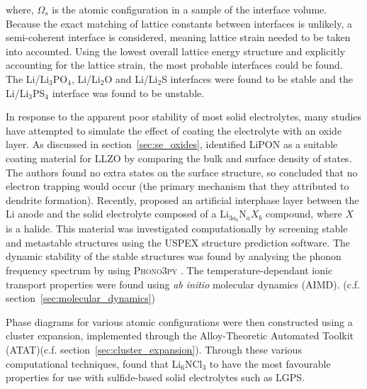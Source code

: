 \documentclass[../main.tex]{subfiles}
\begin{document}
where, $\Omega_s$ is the atomic configuration in a sample of the interface volume. Because the exact matching of lattice constants between interfaces is unlikely, a semi-coherent interface is considered, meaning lattice strain needed to be taken into accounted. Using the lowest overall lattice energy structure and explicitly accounting for the lattice strain, the most probable interfaces could be found. The Li/Li$_3$PO$_4$, Li/Li$_2$O and Li/Li$_2$S interfaces were found to be stable and the Li/Li$_3$PS$_4$ interface was found to be unstable.\cite{Lepley2015}

In response to the apparent poor stability of most solid electrolytes, many studies have attempted to simulate the effect of coating the electrolyte with an oxide layer\cite{Zhang2020directvis, Xiao2019coat, Tian2018}. As discussed in section~\ref{sec:se_oxides}, \citeauthor{Tian2018} identified LiPON as a suitable coating material for LLZO by comparing the bulk and surface density of states\cite{Tian2018}. The authors found no extra states on the surface structure, so concluded that no electron trapping would occur (the primary mechanism that they attributed to dendrite formation). Recently, \citeauthor{Sang2020} proposed an artificial interphase layer between the Li anode and the solid electrolyte composed of a Li$_{3a_b}$N$_{a}X_{b}$ compound, where $X$ is a halide.\cite{Sang2020} 
This material was investigated computationally by screening stable and metastable structures using the USPEX structure prediction software.\cite{Glass2006, Oganov2006} The dynamic stability of the stable structures was found by analysing the phonon frequency spectrum by using \textsc{Phono3py} \cite{Parlinski1997, Togo2008,togo_distributions_2015}. The temperature-dependant ionic transport properties were found using \textit{ab initio} molecular dynamics (AIMD). (c.f. section~\ref{sec:molecular_dynamics})

Phase diagrams for various atomic configurations were then constructed using a cluster expansion, implemented through the Alloy-Theoretic Automated Toolkit (ATAT)(c.f. section~\ref{sec:cluster_expansion}).\cite{Hart2008, VandeWalle2002} Through these various computational techniques, \citeauthor{Sang2020} found that Li$_6$NCl$_3$ to have the most favourable properties for use with sulfide-based solid electrolytes such as LGPS.\cite{Sang2020}
\end{document}
